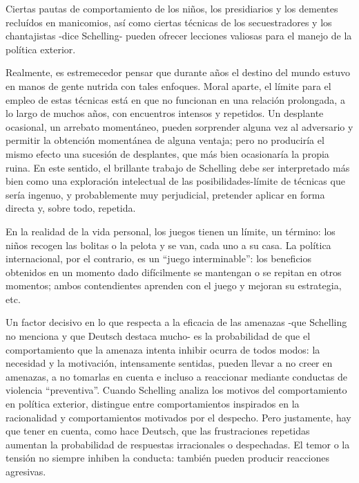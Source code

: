 \documentclass[
]{book}
\begin{document}
Ciertas pautas de comportamiento de los niños, los presidiarios y los dementes recluídos en manicomios, así como ciertas técnicas de los secuestradores y los chantajistas -dice Schelling- pueden ofrecer lecciones valiosas para el manejo de la política exterior.

Realmente, es estremecedor pensar que durante años el destino del mundo estuvo en manos de gente nutrida con tales enfoques. Moral aparte, el límite para el empleo de estas técnicas está en que no funcionan en una relación prolongada, a lo largo de muchos años, con encuentros intensos y repetidos. Un desplante ocasional, un arrebato momentáneo, pueden sorprender alguna vez al adversario y permitir la obtención momentánea de alguna ventaja; pero no produciría el mismo efecto una sucesión de desplantes, que más bien ocasionaría la propia ruina. En este sentido, el brillante trabajo de Schelling debe ser interpretado más bien como una exploración intelectual de las posibilidades-límite de técnicas que sería ingenuo, y probablemente muy perjudicial, pretender aplicar en forma directa y, sobre todo, repetida.

En la realidad de la vida personal, los juegos tienen un límite, un término: los niños recogen las bolitas o la pelota y se van, cada uno a su casa. La política internacional, por el contrario, es un ``juego interminable'': los beneficios obtenidos en un momento dado difícilmente se mantengan o se repitan en otros momentos; ambos contendientes aprenden con el juego y mejoran su estrategia, etc.

Un factor decisivo en lo que respecta a la eficacia de las amenazas -que Schelling no menciona y que Deutsch destaca mucho- es la probabilidad de que el comportamiento que la amenaza intenta inhibir ocurra de todos modos: la necesidad y la motivación, intensamente sentidas, pueden llevar a no creer en amenazas, a no tomarlas en cuenta e incluso a reaccionar mediante conductas de violencia ``preventiva''. Cuando Schelling analiza los motivos del comportamiento en política exterior, distingue entre comportamientos inspirados en la racionalidad y comportamientos motivados por el despecho. Pero justamente, hay que tener en cuenta, como hace Deutsch, que las frustraciones repetidas aumentan la probabilidad de respuestas irracionales o despechadas. El temor o la tensión no siempre inhiben la conducta: también pueden producir reacciones agresivas.
\end{document}
